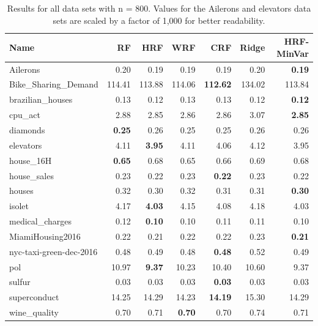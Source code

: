 \begin{table}[ht]
\centering
\begingroup\scriptsize
\begin{tabular}{lrrrrrr}
  \hline
\textbf{ Name } & \textbf{ RF } & \textbf{ HRF } & \textbf{ WRF } & \textbf{ CRF } & \textbf{ Ridge } & \textbf{ HRF-MinVar } \\ 
  \hline
Ailerons & 0.20 & 0.19 & 0.19 & 0.19 & 0.20 & \textbf{0.19} \\ 
  Bike\_Sharing\_Demand & 114.41 & 113.88 & 114.06 & \textbf{112.62} & 134.02 & 113.84 \\ 
  brazilian\_houses & 0.13 & 0.12 & 0.13 & 0.13 & 0.12 & \textbf{0.12} \\ 
  cpu\_act & 2.88 & 2.85 & 2.86 & 2.86 & 3.07 & \textbf{2.85} \\ 
  diamonds & \textbf{0.25} & 0.26 & 0.25 & 0.25 & 0.26 & 0.26 \\ 
  elevators & 4.11 & \textbf{3.95} & 4.11 & 4.06 & 4.12 & 3.95 \\ 
  house\_16H & \textbf{0.65} & 0.68 & 0.65 & 0.66 & 0.69 & 0.68 \\ 
  house\_sales & 0.23 & 0.22 & 0.23 & \textbf{0.22} & 0.23 & 0.22 \\ 
  houses & 0.32 & 0.30 & 0.32 & 0.31 & 0.31 & \textbf{0.30} \\ 
  isolet & 4.17 & \textbf{4.03} & 4.15 & 4.08 & 4.18 & 4.03 \\ 
  medical\_charges & 0.12 & \textbf{0.10} & 0.10 & 0.11 & 0.11 & 0.10 \\ 
  MiamiHousing2016 & 0.22 & 0.21 & 0.22 & 0.22 & 0.23 & \textbf{0.21} \\ 
  nyc-taxi-green-dec-2016 & 0.48 & 0.49 & 0.48 & \textbf{0.48} & 0.52 & 0.49 \\ 
  pol & 10.97 & \textbf{9.37} & 10.23 & 10.40 & 10.60 & 9.37 \\ 
  sulfur & 0.03 & 0.03 & 0.03 & \textbf{0.03} & 0.03 & 0.03 \\ 
  superconduct & 14.25 & 14.29 & 14.23 & \textbf{14.19} & 15.30 & 14.29 \\ 
  wine\_quality & 0.70 & 0.71 & \textbf{0.70} & 0.70 & 0.74 & 0.71 \\ 
   \hline
\end{tabular}
\endgroup
\caption{Results for all data sets with n = 800. Values for the Ailerons and elevators data sets are scaled by a factor of 1,000 for better readability.} 
\end{table}
